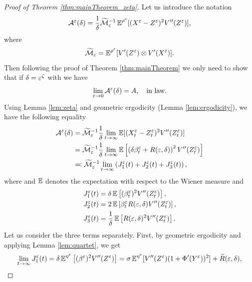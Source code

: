 \documentclass[10pt]{article}
\begin{document}
\begin{appendices}
\begin{proof}[Proof of Theorem \ref{thm:mainTheorem_zeta}]
	Let us introduce the notation
	\begin{equation}
		\mathcal A^\varepsilon(\delta) = \frac1\delta \widetilde{\mathcal M}_\varepsilon^{-1} \operatorname{\mathbb{E}}^{\rho^\varepsilon}[(X^\varepsilon - Z^\varepsilon)^2 V''(Z^\varepsilon)],
	\end{equation}
	where
	\begin{equation}
		\widetilde{\mathcal M}_\varepsilon = \operatorname{\mathbb{E}}^{\rho^\varepsilon} [ V'(Z^\varepsilon) \otimes V'(X^\varepsilon) ].
	\end{equation}
	Then following the proof of Theorem \ref{thm:mainTheorem} we only need to show that if $\delta = \varepsilon^\zeta$ with  we have
	\begin{equation}
		\lim_{\varepsilon \to 0} \mathcal A^\varepsilon(\delta) = A, \quad \text{in law}.
	\end{equation}
	Using Lemma \ref{lem:zeta} and geometric ergodicity (Lemma \ref{lem:ergodicity}), we have the following equality
	\begin{equation}
	\begin{aligned}
		\mathcal A^\varepsilon(\delta) &= \widetilde{\mathcal M}_\varepsilon^{-1} \frac1\delta \lim_{t \to \infty} \operatorname{\mathbb{E}} [(X_t^\varepsilon - Z_t^\varepsilon)^2 V''(Z_t^\varepsilon)] \\
		&= \widetilde{\mathcal M}_\varepsilon^{-1} \frac1\delta \lim_{t \to \infty} \operatorname{\mathbb{E}} \left[ \left( \delta \beta_t^\varepsilon + R(\varepsilon,\delta) \right)^2 V''(Z_t^\varepsilon) \right] \\
		&\eqqcolon \widetilde{\mathcal M}_\varepsilon^{-1} \lim_{t \to \infty} \left( J_1^\varepsilon(t) + J_2^\varepsilon(t) + J_3^\varepsilon(t) \right),
	\end{aligned}
	\end{equation}
	where and $\operatorname{\mathbb{E}}$ denotes the expectation with respect to the Wiener measure and
	\begin{equation}
	\begin{aligned}
		J_1^\varepsilon(t) &= \delta \operatorname{\mathbb{E}} \left[ (\beta_t^\varepsilon)^2 V''(Z_t^\varepsilon) \right], \\
		J_2^\varepsilon(t) &= 2 \operatorname{\mathbb{E}} \left[ \beta_t^\varepsilon R(\varepsilon,\delta) V''(Z_t^\varepsilon) \right], \\
		J_3^\varepsilon(t) &= \frac1\delta \operatorname{\mathbb{E}}\left[ R(\varepsilon,\delta)^2 V''(Z_t^\varepsilon) \right].
	\end{aligned}
	\end{equation}
	Let us consider the three terms separately. First, by geometric ergodicity and applying Lemma \ref{lem:quartet}, we get
	\begin{equation}
	\lim_{t \to \infty} J_1^\epl(t) = \delta \E^{\eta^\epl} \left[ (\beta^\epl)^2 V''(Z^\epl) \right] = \sigma \E^{\eta^\epl} [V''(Z^\epl) (1 + \Phi'(Y^\epl))^2] + \widetilde R(\epl,\delta),

\end{equation}
\end{proof}
\end{appendices}
\end{document}
